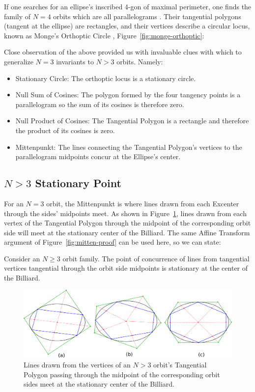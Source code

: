 If one searches for an ellipse's inscribed 4-gon of maximal perimeter, one finds the family of $N=4$ orbits which are all parallelograms \cite{connes07}. Their tangential polygons (tangent at the ellipse) are rectangles, and their vertices describe a circular locus, known as Monge's Orthoptic Circle \cite{mw}, Figure~\ref{fig:monge-orthoptic}:

Close observation of the above provided us with invaluable clues with which to generalize $N=3$ invariants to $N>3$ orbits. Namely:

\begin{itemize}
    \item Stationary Circle: The orthoptic locus is a stationary circle.
    \item Null Sum of Cosines: The polygon formed by the four tangency points is a parallelogram so the sum of its cosines is therefore zero.
    \item Null Product of Cosines: The Tangential Polygon is a rectangle and therefore the product of its cosines is zero.
    \item Mittenpunkt: The lines connecting the Tangential Polygon's vertices to the parallelogram midpoints concur at the Ellipse's center.
\end{itemize}

\subsection{$N>3$ Stationary Point}

For an $N=3$ orbit, the Mittenpunkt is where lines drawn from each Excenter through the sides' midpoints meet. As shown in Figure~\ref{fig:gen-mitten}, lines drawn from each vertex of the Tangential Polygon through the midpoint of the corresponding orbit side will meet at the stationary center of the Billiard. The same Affine Transform argument of Figure~\ref{fig:mitten-proof} can be used here, so we can state:

\begin{observation}
Consider an $N\geq{3}$ orbit family. The point of concurrence of lines from tangential vertices tangential through the orbit side midpoints is stationary at the center of the Billiard.
\end{observation}

\begin{figure}
    \centering
    \includegraphics[width=\textwidth]{pics/0150_gener_mitten.pdf}
    \caption{Lines drawn from the vertices of an $N>3$ orbit's Tangential Polygon passing through the midpoint of the corresponding orbit sides meet at the stationary center of the Billiard.}
    \label{fig:gen-mitten}
\end{figure}

